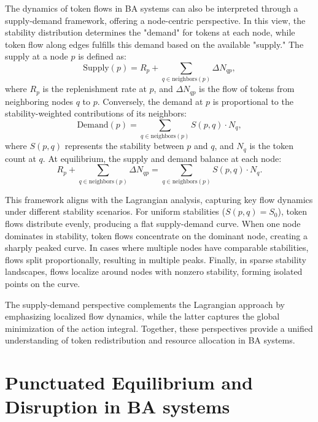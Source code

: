 \documentclass[entropy,article,submit,pdftex,oneauthor]{Definitions/mdpi}
\begin{document}
The dynamics of token flows in BA systems can also be interpreted through a supply-demand framework, offering a node-centric perspective. In this view, the stability distribution determines the "demand" for tokens at each node, while token flow along edges fulfills this demand based on the available "supply." The supply at a node \(p\) is defined as:
\begin{equation}
\text{Supply}(p) = R_p + \sum_{q \in \text{neighbors}(p)} \Delta N_{qp},
\end{equation}
where \(R_p\) is the replenishment rate at \(p\), and \(\Delta N_{qp}\) is the flow of tokens from neighboring nodes \(q\) to \(p\). Conversely, the demand at \(p\) is proportional to the stability-weighted contributions of its neighbors:
\begin{equation}
\text{Demand}(p) = \sum_{q \in \text{neighbors}(p)} S(p, q) \cdot N_q,
\end{equation}
where \(S(p, q)\) represents the stability between \(p\) and \(q\), and \(N_q\) is the token count at \(q\). At equilibrium, the supply and demand balance at each node:
\begin{equation}
R_p + \sum_{q \in \text{neighbors}(p)} \Delta N_{qp} = \sum_{q \in \text{neighbors}(p)} S(p, q) \cdot N_q.
\end{equation}

This framework aligns with the Lagrangian analysis, capturing key flow dynamics under different stability scenarios. For uniform stabilities (\(S(p, q) = S_0\)), token flows distribute evenly, producing a flat supply-demand curve. When one node dominates in stability, token flows concentrate on the dominant node, creating a sharply peaked curve. In cases where multiple nodes have comparable stabilities, flows split proportionally, resulting in multiple peaks. Finally, in sparse stability landscapes, flows localize around nodes with nonzero stability, forming isolated points on the curve.

The supply-demand perspective complements the Lagrangian approach by emphasizing localized flow dynamics, while the latter captures the global minimization of the action integral. Together, these perspectives provide a unified understanding of token redistribution and resource allocation in BA systems.

\section{Punctuated Equilibrium and Disruption in BA systems}
\end{document}
